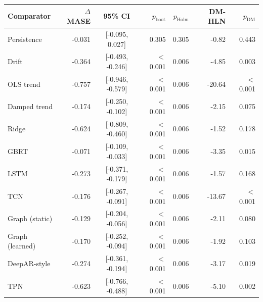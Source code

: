 \begin{tabular}{@{}lrcrrrr@{}}
\toprule
Comparator & $\Delta$MASE & 95\% CI & $p_{\mathrm{boot}}$ & $p_{\mathrm{Holm}}$ & DM-HLN & $p_{\mathrm{DM}}$ \\
\midrule
Persistence & -0.031 & [-0.095, 0.027] & 0.305 & 0.305 & -0.82 & 0.443 \\
Drift & -0.364 & [-0.493, -0.246] & $<$0.001 & 0.006 & -4.85 & 0.003 \\
OLS trend & -0.757 & [-0.946, -0.579] & $<$0.001 & 0.006 & -20.64 & $<$0.001 \\
Damped trend & -0.174 & [-0.250, -0.102] & $<$0.001 & 0.006 & -2.15 & 0.075 \\
Ridge & -0.624 & [-0.809, -0.460] & $<$0.001 & 0.006 & -1.52 & 0.178 \\
GBRT & -0.071 & [-0.109, -0.033] & $<$0.001 & 0.006 & -3.35 & 0.015 \\
LSTM & -0.273 & [-0.371, -0.179] & $<$0.001 & 0.006 & -1.57 & 0.168 \\
TCN & -0.176 & [-0.267, -0.091] & $<$0.001 & 0.006 & -13.67 & $<$0.001 \\
Graph (static) & -0.129 & [-0.204, -0.056] & $<$0.001 & 0.006 & -2.11 & 0.080 \\
Graph (learned) & -0.170 & [-0.252, -0.094] & $<$0.001 & 0.006 & -1.92 & 0.103 \\
DeepAR-style & -0.274 & [-0.361, -0.194] & $<$0.001 & 0.006 & -3.17 & 0.019 \\
TPN & -0.623 & [-0.766, -0.488] & $<$0.001 & 0.006 & -5.10 & 0.002 \\
\bottomrule
\end{tabular}
